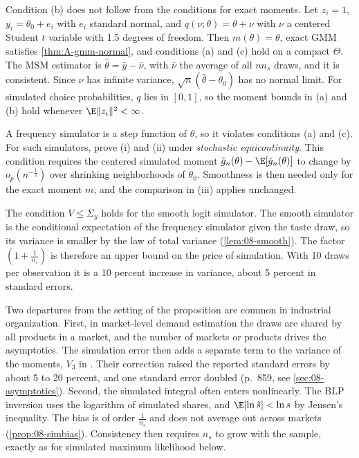 Condition (b) does not follow from the conditions for exact moments. Let $z_i = 1$, $y_i = \theta_0 + e_i$ with
$e_i$ standard normal, and $q(\nu;\theta) = \theta + \nu$ with $\nu$ a centered Student $t$ variable with 1.5 degrees
of freedom. Then $m(\theta) = \theta$, exact GMM satisfies \cref{thm:A-gmm-normal}, and conditions (a) and (c)
hold on a compact $\Theta$. The MSM estimator is
$\hat\theta = \bar y - \bar\nu$, with $\bar\nu$ the average of all $nn_s$ draws, and it is consistent. Since $\nu$ has
infinite variance, $\sqrt n(\hat\theta - \theta_0)$ has no normal limit. For simulated choice probabilities, $q$ lies in
$[0, 1]$, so the moment bounds in (a) and (b) hold whenever $\E\lVert z_i\rVert^2 < \infty$.

A frequency simulator is a step function of $\theta$, so it violates conditions (a) and (c). For such simulators,
\citet{PakesPollard1989} prove (i) and (ii) under \emph{stochastic equicontinuity}. This condition requires the
centered simulated moment $\tilde g_n(\theta) - \E[\tilde g_n(\theta)]$ to change by $o_p(n^{-\frac{1}{2}})$ over
shrinking neighborhoods of $\theta_0$. Smoothness is then needed only for the exact moment $m$, and the comparison in
(iii) applies unchanged.

The condition $V \le \Sigma_y$ holds for the smooth logit simulator. The smooth simulator is the conditional
expectation of the frequency simulator given the taste draw, so its variance is smaller by the law of total
variance (\cref{lem:08-smooth}). The factor $(1 + \frac{1}{n_s})$ is therefore an upper bound on the price of
simulation. With 10 draws per observation it is a 10 percent increase in variance, about 5 percent in standard
errors.

Two departures from the setting of the proposition are common in industrial organization. First, in market-level
demand estimation the draws are shared by all products in a market, and the number of markets or products drives
the asymptotics. The simulation error then adds a separate term to the variance of the moments, $V_3$ in
\citet{BerryLevinsohnPakes1995}. Their correction raised the reported standard errors by about 5 to 20 percent,
and one standard error doubled (p.~859, see \cref{sec:08-asymptotics}). Second, the simulated integral often enters
nonlinearly. The BLP inversion uses the logarithm of simulated shares, and $\E[\ln\tilde s] < \ln s$ by Jensen's
inequality. The bias is of order $\frac{1}{n_s}$ and does not average out across markets (\cref{prop:08-simbias}).
Consistency then requires $n_s$ to grow with the sample, exactly as for simulated maximum likelihood below.

